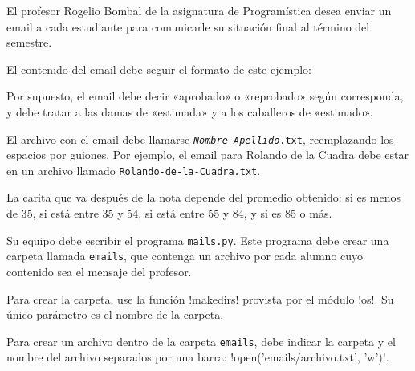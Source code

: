 \begin{certamen}[leftmargin=0pt]
  \newpage
  \item
    El profesor Rogelio Bombal de la asignatura de Programística
    desea enviar
    un email a cada estudiante para comunicarle su situación final
    al término del semestre.

    El contenido del email debe seguir el formato de este ejemplo:
    

    Por supuesto,
    el email debe decir «aprobado» o «reprobado» según corresponda,
    y debe tratar a las damas de «estimada»
    y a los caballeros de «estimado».

    El archivo con el email debe llamarse
    \texttt{\textit{Nombre}-\textit{Apellido}.txt},
    reemplazando los espacios por guiones.
    Por ejemplo,
    el email para Rolando de la Cuadra
    debe estar en un archivo llamado \texttt{Rolando-de-la-Cuadra.txt}.

    La carita que va después de la nota
    depende del promedio obtenido:
     si es menos de 35,
    \framebox{\texttt{:(}}  si está entre 35 y 54,
    \framebox{\texttt{:)}}  si está entre 55 y 84, y
      si es 85 o más.

    Su equipo debe escribir el programa \verb!mails.py!.
    Este programa debe
    crear una carpeta llamada \verb!emails!,
    que contenga un archivo por cada alumno
    cuyo contenido sea el mensaje del profesor.

    Para crear la carpeta,
    use la función \li!makedirs!
    provista por el módulo \li!os!.
    Su único parámetro es el nombre de la carpeta.

    Para crear un archivo dentro de la carpeta \verb!emails!,
    debe indi\-car la carpeta y el nombre del archivo
    separados por una barra: \li!open('emails/archivo.txt', 'w')!.


\end{certamen}
